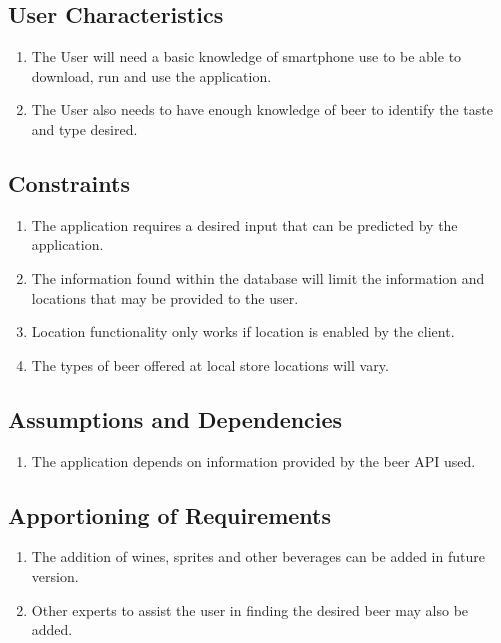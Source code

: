 \documentclass[]{article}
\begin{document}
\subsection{User Characteristics}
\label{sub:user_characteristics}
\begin{enumerate}

	\item The User will need a basic knowledge of smartphone use to be able to download, run and use the application. 
	\item The User also needs to have enough knowledge of beer to identify the taste and type desired.

\end{enumerate}

\subsection{Constraints}
\label{sub:constraints}
\begin{enumerate}

	\item The application requires a desired input that can be predicted by the application.
	\item The information found within the database will limit the information and locations that may be provided to the user.
	\item Location functionality only works if location is enabled by the client.
	\item The types of beer offered at local store locations will vary.
	
\end{enumerate}

\subsection{Assumptions and Dependencies}
\label{sub:assumptions_and_dependencies}
\begin{enumerate}

\item The application depends on information provided by the beer API used.


\end{enumerate}

\subsection{Apportioning of Requirements}
\label{sub:apportioning_of_requirements}
\begin{enumerate}
	\item The addition of wines, sprites and other beverages can be added in future version.
	\item Other experts to assist the user in finding the desired beer may also be added.
\end{enumerate}
\end{document}
